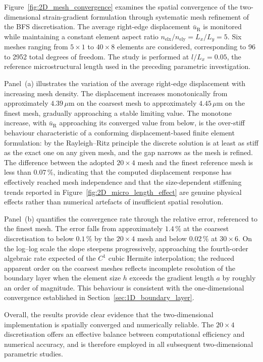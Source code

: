 \documentclass[final,3p,times,fleqn]{elsarticle}
\begin{document}
Figure~\ref{fig:2D_mesh_convergence} examines the spatial convergence
of the two-dimensional strain-gradient formulation through systematic
mesh refinement of the BFS discretisation.
The average right-edge displacement $\bar{u}_{\mathrm{R}}$ is monitored
while maintaining a constant element aspect ratio
$n_{\mathrm{elx}}/n_{\mathrm{ely}} = L_{x}/L_{y} = 5$.
Six meshes ranging from $5\times1$ to $40\times8$ elements are
considered, corresponding to 96 to 2952 total degrees of freedom.
The study is performed at $l/L_{x} = 0.05$, the reference
microstructural length used in the preceding parametric investigation.

Panel~(a) illustrates the variation of the average right-edge
displacement with increasing mesh density.
The displacement increases monotonically from approximately
$4.39\,\mu\mathrm{m}$ on the coarsest mesh to approximately
$4.45\,\mu\mathrm{m}$ on the finest mesh, gradually approaching a
stable limiting value.
The monotone increase, with $\bar{u}_{\mathrm{R}}$ approaching its
converged value from below, is the over-stiff behaviour characteristic
of a conforming displacement-based finite element formulation: by the
Rayleigh--Ritz principle the discrete solution is at least as stiff as
the exact one on any given mesh, and the gap narrows as the mesh is
refined.
The difference between the adopted $20\times4$ mesh and the finest
reference mesh is less than $0.07\,\%$, indicating that the computed
displacement response has effectively reached mesh independence and
that the size-dependent stiffening trends reported in
Figure~\ref{fig:2D_micro_length_effect} are genuine physical effects
rather than numerical artefacts of insufficient spatial resolution.

Panel~(b) quantifies the convergence rate through the relative error,
referenced to the finest mesh.
The error falls from approximately $1.4\,\%$ at the coarsest
discretisation to below $0.1\,\%$ by the $20\times4$ mesh and below
$0.02\,\%$ at $30\times6$.
On the log--log scale the slope steepens progressively, approaching
the fourth-order algebraic rate expected of the $C^{1}$ cubic Hermite
interpolation; the reduced apparent order on the coarsest meshes
reflects incomplete resolution of the boundary layer when the element
size $h$ exceeds the gradient length $a$ by roughly an order of
magnitude.
This behaviour is consistent with the one-dimensional convergence
established in Section~\ref{sec:1D_boundary_layer}.

Overall, the results provide clear evidence that the two-dimensional
implementation is spatially converged and numerically reliable.
The $20\times4$ discretisation offers an effective balance between
computational efficiency and numerical accuracy, and is therefore
employed in all subsequent two-dimensional parametric studies.
\end{document}
